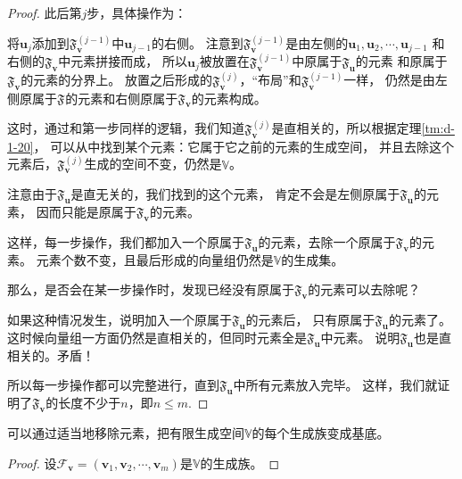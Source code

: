 \documentclass[12pt,UTF8]{ctexbook}
\begin{document}
\begin{appendix}
\begin{proof}
    此后第$j$步，具体操作为：

    将$\mathbf{u}_j$添加到$\mathfrak{F}_{\mathbf{v}}^{(j-1)}$中$\mathbf{u}_{j-1}$的右侧。
    注意到$\mathfrak{F}_{\mathbf{v}}^{(j-1)}$是由左侧的$\mathbf{u}_1, \mathbf{u}_2, \cdots , \mathbf{u}_{j-1}$
    和右侧的$\mathfrak{F}_{\mathbf{v}}$中元素拼接而成，
    所以$\mathbf{u}_j$被放置在$\mathfrak{F}_{\mathbf{v}}^{(j-1)}$中原属于$\mathfrak{F}_{\mathbf{u}}$的元素
    和原属于$\mathfrak{F}_{\mathbf{v}}$的元素的分界上。
    放置之后形成的$\mathfrak{F}_{\mathbf{v}}^{(j)}$，“布局”和$\mathfrak{F}_{\mathbf{v}}^{(j-1)}$一样，
    仍然是由左侧原属于$\mathfrak{F}_{\mathbf{}}$的元素和右侧原属于$\mathfrak{F}_{\mathbf{v}}$的元素构成。
    
    这时，通过和第一步同样的逻辑，我们知道$\mathfrak{F}_{\mathbf{v}}^{(j)}$是直相关的，所以根据定理\ref{tm:d-1-20}，
    可以从中找到某个元素：它属于它之前的元素的生成空间，
    并且去除这个元素后，$\mathfrak{F}_{\mathbf{v}}^{(j)}$生成的空间不变，仍然是$\mathbb{V}$。

    注意由于$\mathfrak{F}_{\mathbf{u}}$是直无关的，我们找到的这个元素，
    肯定不会是左侧原属于$\mathfrak{F}_{\mathbf{u}}$的元素，
    因而只能是原属于$\mathfrak{F}_{\mathbf{v}}$的元素。

    这样，每一步操作，我们都加入一个原属于$\mathfrak{F}_{\mathbf{u}}$的元素，去除一个原属于$\mathfrak{F}_{\mathbf{v}}$的元素。
    元素个数不变，且最后形成的向量组仍然是$\mathbb{V}$的生成集。

    那么，是否会在某一步操作时，发现已经没有原属于$\mathfrak{F}_{\mathbf{v}}$的元素可以去除呢？

    如果这种情况发生，说明加入一个原属于$\mathfrak{F}_{\mathbf{u}}$的元素后，
    只有原属于$\mathfrak{F}_{\mathbf{u}}$的元素了。
    这时候向量组一方面仍然是直相关的，但同时元素全是$\mathfrak{F}_{\mathbf{u}}$中元素。
    说明$\mathfrak{F}_{\mathbf{u}}$也是直相关的。矛盾！

    所以每一步操作都可以完整进行，直到$\mathfrak{F}_{\mathbf{u}}$中所有元素放入完毕。
    这样，我们就证明了$\mathfrak{F}_{\mathbf{v}}$的长度不少于$n$，即$n \leq m$.
\end{proof}

\begin{tm}\label{tm:d-1-40}
    可以通过适当地移除元素，把有限生成空间$\mathbb{V}$的每个生成族变成基底。
\end{tm}

\begin{proof}
    设$\mathcal{F}_{\mathbf{v}} = (\mathbf{v}_1, \mathbf{v}_2, \cdots , \mathbf{v}_m )$是$\mathbb{V}$的生成族。
    

\end{proof}
\end{appendix}
\end{document}
